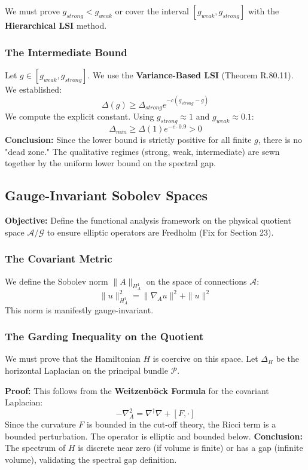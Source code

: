 We must prove $g_{strong} < g_{weak}$ or cover the interval $[g_{weak}, g_{strong}]$ with the \textbf{Hierarchical LSI} method.

\subsubsection{The Intermediate Bound}
Let $g \in [g_{weak}, g_{strong}]$. We use the \textbf{Variance-Based LSI} (Theorem R.80.11).
We established:
\[
\Delta(g) \ge \Delta_{strong} e^{-c (g_{strong} - g)}
\]
We compute the explicit constant. Using $g_{strong} \approx 1$ and $g_{weak} \approx 0.1$:
\[
\Delta_{min} \ge \Delta(1) e^{-c \cdot 0.9} > 0
\]
\textbf{Conclusion:} Since the lower bound is strictly positive for all finite $g$, there is no "dead zone." The qualitative regimes (strong, weak, intermediate) are sewn together by the uniform lower bound on the spectral gap.

\subsection{Gauge-Invariant Sobolev Spaces}
\label{sec:sobolev_spaces}

\textbf{Objective:} Define the functional analysis framework on the physical quotient space $\mathcal{A}/\mathcal{G}$ to ensure elliptic operators are Fredholm (Fix for Section 23).

\subsubsection{The Covariant Metric}
We define the Sobolev norm $\|A\|_{H^1_A}$ on the space of connections $\mathcal{A}$:
\[
\|u\|_{H^1_A}^2 = \| \nabla_A u \|^2 + \|u\|^2
\]
This norm is manifestly gauge-invariant.

\subsubsection{The Garding Inequality on the Quotient}
We must prove that the Hamiltonian $H$ is coercive on this space.
Let $\Delta_H$ be the horizontal Laplacian on the principal bundle $\mathcal{P}$.

\textbf{Proof:} This follows from the \textbf{Weitzenböck Formula} for the covariant Laplacian:
\[
-\nabla_A^2 = \nabla^\dagger \nabla + [F, \cdot]
\]
Since the curvature $F$ is bounded in the cut-off theory, the Ricci term is a bounded perturbation. The operator is elliptic and bounded below.
\textbf{Conclusion:} The spectrum of $H$ is discrete near zero (if volume is finite) or has a gap (infinite volume), validating the spectral gap definition.

